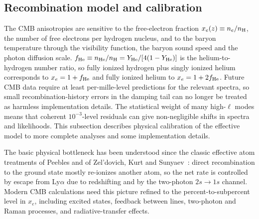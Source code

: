 \documentclass[prd, twocolumn, superscriptaddress, tightenlines, longbibliography, nofootinbib, eqsecnum, amsfonts, amsmath, floatfix, notitlepage]{revtex4-2}
\begin{document}
\subsection{Recombination model and calibration}
\label{sec:recomb-model}

The CMB anisotropies are sensitive to the free-electron fraction
$x_e(z)\equiv n_e/n_{\rm H}$, the number of free electrons per hydrogen
nucleus, and to the baryon temperature through the visibility function, the
baryon sound speed and the photon diffusion scale.
$f_{\rm He}\equiv n_{\rm He}/n_{\rm H}=Y_{\rm He}/[4(1-Y_{\rm He})]$ is the
helium-to-hydrogen number ratio, so fully ionized hydrogen plus singly ionized
helium corresponds to $x_e=1+f_{\rm He}$ and fully ionized helium to
$x_e=1+2f_{\rm He}$. Future CMB data require at least per-mille-level predictions
for the relevant spectra, so small recombination-history errors in the damping
tail can no longer be treated as harmless implementation details. The statistical
weight of many high-$\ell$ modes means that coherent $10^{-3}$-level residuals
can give non-negligible shifts in spectra and likelihoods. This subsection
describes physical calibration of the effective model to more complete analyses and
some implementation details.

The basic physical bottleneck has been understood since the classic effective
atom treatments of Peebles and of Zel'dovich, Kurt and
Sunyaev~\cite{Peebles:1968ja,Zeldovich:1968}: direct recombination to the ground
state mostly re-ionizes another atom, so the net rate is controlled by escape
from Ly$\alpha$ due to redshifting and by the two-photon $2s\to1s$ channel.
Modern CMB calculations
need this picture refined to the percent-to-subpercent level in $x_e$, including
excited states, feedback between lines, two-photon and Raman processes, and
radiative-transfer effects.
\end{document}

